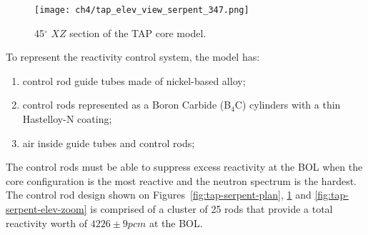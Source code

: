 \begin{figure}[htp!] %
	\centering
	\texttt{[image: ch4/tap\_elev\_view\_serpent\_347.png]}
	\caption{45$^{\circ}$ $XZ$ section of the \gls{TAP} core model.}
	\label{fig:tap-serpent-elev}
\end{figure}

To represent the reactivity control system, the model has: 
\begin{enumerate}[label=(\alph*), noitemsep]
	\item control rod guide tubes made of nickel-based alloy;
	\item control rods represented as a Boron Carbide (B$_4$C) cylinders 
	with a thin Hastelloy-N coating;
	\item air inside guide tubes and control rods;
\end{enumerate}
The control rods must be able to suppress excess reactivity at the \gls{BOL} 
when the core configuration is the most reactive and the neutron spectrum is 
the hardest. The control rod design shown on 
Figures~\ref{fig:tap-serpent-plan}, \ref{fig:tap-serpent-elev} and 
\ref{fig:tap-serpent-elev-zoom} is 
comprised of a cluster of 25 rods that provide a total reactivity worth of 
$4226\pm9pcm$ at the \gls{BOL}.

